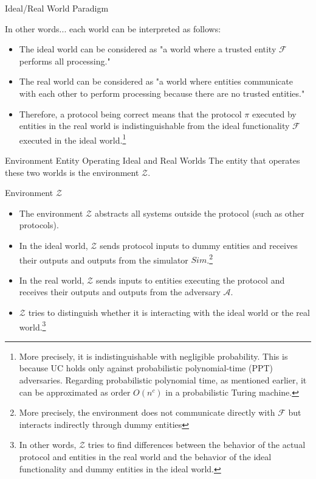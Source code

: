 \documentclass[aspectratio=169,10pt]{beamer}
\newenvironment{proofblock}[1][]
{\begin{block}{#1}\vspace{0.5em}}
{\vspace{0.5em}\end{block}}
\newenvironment{outlineblock}[1][]
{\begin{tcolorbox}[colframe=black, colback=white, boxrule=1pt, boxsep=5pt]}
{\end{tcolorbox}}
\begin{document}
\begin{frame}{Ideal/Real World Paradigm}
  \begin{outlineblock}{}
    In other words... each world can be interpreted as follows:
    \begin{itemize}
        \item The ideal world can be considered as "a world where a trusted entity $\mathcal{F}$ performs all processing."
        \item The real world can be considered as "a world where entities communicate with each other to perform processing because there are no trusted entities."
        \item Therefore, a protocol being correct means that the protocol $\pi$ executed by entities in the real world is indistinguishable from the ideal functionality $\mathcal{F}$ executed in the ideal world.\footnote{More precisely, it is indistinguishable with negligible probability. This is because UC holds only against probabilistic polynomial-time (PPT) adversaries. Regarding probabilistic polynomial time, as mentioned earlier, it can be approximated as order $O(n^c)$ in a probabilistic Turing machine.}
    \end{itemize}
  \end{outlineblock}
\end{frame}


\begin{frame}{Environment Entity Operating Ideal and Real Worlds}
    The entity that operates these two worlds is the environment $\mathcal{Z}$.
    \begin{proofblock}[Environment $\mathcal{Z}$]
    \begin{itemize}
      \item The environment $\mathcal{Z}$ abstracts all systems outside the protocol (such as other protocols).
      \item In the ideal world, $\mathcal{Z}$ sends protocol inputs to dummy entities and receives their outputs and outputs from the simulator $Sim$.\footnote{More precisely, the environment does not communicate directly with $\mathcal{F}$ but interacts indirectly through dummy entities}
      \item In the real world, $\mathcal{Z}$ sends inputs to entities executing the protocol and receives their outputs and outputs from the adversary $\mathcal{A}$.
      \item $\mathcal{Z}$ tries to distinguish whether it is interacting with the ideal world or the real world.\footnote{In other words, $\mathcal{Z}$ tries to find differences between the behavior of the actual protocol and entities in the real world and the behavior of the ideal functionality and dummy entities in the ideal world.}
    \end{itemize}
  \end{proofblock}
\end{frame}
\end{document}
